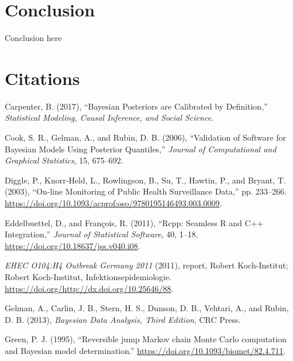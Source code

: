 \documentclass[11pt,a4paper]{article}
\numberwithin{equation}{section}
\begin{document}
\pagebreak

\hypertarget{conclusion}{%
\section{Conclusion}\label{conclusion}}

Conclusion here

\pagebreak

\hypertarget{citations}{%
\section*{Citations}\label{citations}}

\hypertarget{refs}{}
\leavevmode\hypertarget{ref-carpenter_bayesian_2017}{}%
Carpenter, B. (2017), ``Bayesian Posteriors are Calibrated by
Definition,'' \emph{Statistical Modeling, Causal Inference, and Social
Science}.

\leavevmode\hypertarget{ref-cook_validation_2006}{}%
Cook, S. R., Gelman, A., and Rubin, D. B. (2006), ``Validation of
Software for Bayesian Models Using Posterior Quantiles,'' \emph{Journal
of Computational and Graphical Statistics}, 15, 675--692.

\leavevmode\hypertarget{ref-diggle_-line_2003}{}%
Diggle, P., Knorr-Held, L., Rowlingson, B., Su, T., Hawtin, P., and
Bryant, T. (2003), ``On-line Monitoring of Public Health Surveillance
Data,'' pp. 233--266.
\url{https://doi.org/10.1093/acprof:oso/9780195146493.003.0009}.

\leavevmode\hypertarget{ref-eddelbuettel_rcpp_2011}{}%
Eddelbuettel, D., and François, R. (2011), ``Rcpp: Seamless R and C++
Integration,'' \emph{Journal of Statistical Software}, 40, 1--18.
\url{https://doi.org/10.18637/jss.v040.i08}.

\leavevmode\hypertarget{ref-noauthor_ehec_2011}{}%
\emph{EHEC O104:H4 Outbreak Germany 2011} (2011), report, Robert
Koch-Institut; Robert Koch-Institut, Infektionsepidemiologie.
\url{https://doi.org/http://dx.doi.org/10.25646/88}.

\leavevmode\hypertarget{ref-gelman_bayesian_2013}{}%
Gelman, A., Carlin, J. B., Stern, H. S., Dunson, D. B., Vehtari, A., and
Rubin, D. B. (2013), \emph{Bayesian Data Analysis, Third Edition}, CRC
Press.

\leavevmode\hypertarget{ref-green_reversible_1995}{}%
Green, P. J. (1995), ``Reversible jump Markov chain Monte Carlo
computation and Bayesian model determination.''
\url{https://doi.org/10.1093/biomet/82.4.711}.
\end{document}
